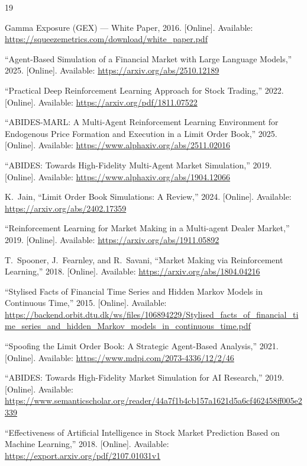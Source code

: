 \documentclass[conference]{IEEEtran}
\begin{document}
\begin{thebibliography}{19}

Gamma Exposure (GEX) --- White Paper, 2016. [Online]. Available:
\url{https://squeezemetrics.com/download/white_paper.pdf}

``Agent-Based Simulation of a Financial Market with Large Language
Models,'' 2025. [Online]. Available:
\url{https://arxiv.org/abs/2510.12189}

``Practical Deep Reinforcement Learning Approach for Stock
Trading,'' 2022. [Online]. Available:
\url{https://arxiv.org/pdf/1811.07522}

``ABIDES-MARL: A Multi-Agent Reinforcement Learning Environment for
Endogenous Price Formation and Execution in a Limit Order Book,''
2025. [Online]. Available:
\url{https://www.alphaxiv.org/abs/2511.02016}

``ABIDES: Towards High-Fidelity Multi-Agent Market Simulation,''
2019. [Online]. Available:
\url{https://www.alphaxiv.org/abs/1904.12066}

K.~Jain, ``Limit Order Book Simulations: A Review,'' 2024. [Online].
Available: \url{https://arxiv.org/abs/2402.17359}

``Reinforcement Learning for Market Making in a Multi-agent Dealer
Market,'' 2019. [Online]. Available:
\url{https://arxiv.org/abs/1911.05892}

T.~Spooner, J.~Fearnley, and R.~Savani, ``Market Making via
Reinforcement Learning,'' 2018. [Online]. Available:
\url{https://arxiv.org/abs/1804.04216}

``Stylised Facts of Financial Time Series and Hidden Markov Models
in Continuous Time,'' 2015. [Online]. Available:
\url{https://backend.orbit.dtu.dk/ws/files/106894229/Stylised_facts_of_financial_time_series_and_hidden_Markov_models_in_continuous_time.pdf}

``Spoofing the Limit Order Book: A Strategic Agent-Based
Analysis,'' 2021. [Online]. Available:
\url{https://www.mdpi.com/2073-4336/12/2/46}

``ABIDES: Towards High-Fidelity Market Simulation for AI
Research,'' 2019. [Online]. Available:
\url{https://www.semanticscholar.org/reader/44a7f1b4cb157a1621d5a6cf462458ff005e2339}

``Effectiveness of Artificial Intelligence in Stock Market
Prediction Based on Machine Learning,'' 2018. [Online]. Available:
\url{https://export.arxiv.org/pdf/2107.01031v1}


\end{thebibliography}
\end{document}
